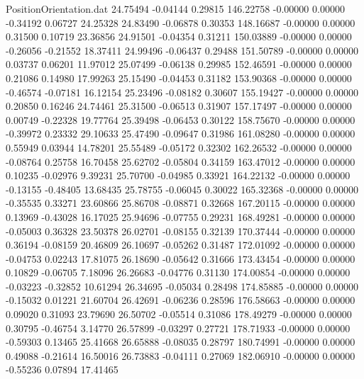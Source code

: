 \begin{filecontents}{PositionOrientation.dat}
  24.75494   -0.04144    0.29815   146.22758   -0.00000    0.00000   -0.34192    0.06727   24.25328
  24.83490   -0.06878    0.30353   148.16687   -0.00000    0.00000    0.31500    0.10719   23.36856
  24.91501   -0.04354    0.31211   150.03889   -0.00000    0.00000   -0.26056   -0.21552   18.37411
  24.99496   -0.06437    0.29488   151.50789   -0.00000    0.00000    0.03737    0.06201   11.97012
  25.07499   -0.06138    0.29985   152.46591   -0.00000    0.00000    0.21086    0.14980   17.99263
  25.15490   -0.04453    0.31182   153.90368   -0.00000    0.00000   -0.46574   -0.07181   16.12154
  25.23496   -0.08182    0.30607   155.19427   -0.00000    0.00000    0.20850    0.16246   24.74461
  25.31500   -0.06513    0.31907   157.17497   -0.00000    0.00000    0.00749   -0.22328   19.77764
  25.39498   -0.06453    0.30122   158.75670   -0.00000    0.00000   -0.39972    0.23332   29.10633
  25.47490   -0.09647    0.31986   161.08280   -0.00000    0.00000    0.55949    0.03944   14.78201
  25.55489   -0.05172    0.32302   162.26532   -0.00000    0.00000   -0.08764    0.25758   16.70458
  25.62702   -0.05804    0.34159   163.47012   -0.00000    0.00000    0.10235   -0.02976    9.39231
  25.70700   -0.04985    0.33921   164.22132   -0.00000    0.00000   -0.13155   -0.48405   13.68435
  25.78755   -0.06045    0.30022   165.32368   -0.00000    0.00000   -0.35535    0.33271   23.60866
  25.86708   -0.08871    0.32668   167.20115   -0.00000    0.00000    0.13969   -0.43028   16.17025
  25.94696   -0.07755    0.29231   168.49281   -0.00000    0.00000   -0.05003    0.36328   23.50378
  26.02701   -0.08155    0.32139   170.37444   -0.00000    0.00000    0.36194   -0.08159   20.46809
  26.10697   -0.05262    0.31487   172.01092   -0.00000    0.00000   -0.04753    0.02243   17.81075
  26.18690   -0.05642    0.31666   173.43454   -0.00000    0.00000    0.10829   -0.06705    7.18096
  26.26683   -0.04776    0.31130   174.00854   -0.00000    0.00000   -0.03223   -0.32852   10.61294
  26.34695   -0.05034    0.28498   174.85885   -0.00000    0.00000   -0.15032    0.01221   21.60704
  26.42691   -0.06236    0.28596   176.58663   -0.00000    0.00000    0.09020    0.31093   23.79690
  26.50702   -0.05514    0.31086   178.49279   -0.00000    0.00000    0.30795   -0.46754    3.14770
  26.57899   -0.03297    0.27721   178.71933   -0.00000    0.00000   -0.59303    0.13465   25.41668
  26.65888   -0.08035    0.28797   180.74991   -0.00000    0.00000    0.49088   -0.21614   16.50016
  26.73883   -0.04111    0.27069   182.06910   -0.00000    0.00000   -0.55236    0.07894   17.41465

\end{filecontents}
